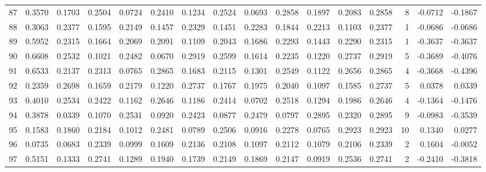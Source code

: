 \begin{tabular}{lrrrrrrrrrrrrrrr}
87  &      0.3570 &  0.1703 &  0.2504 &  0.0724 &  0.2410 &  0.1234 &  0.2524 &  0.0693 &  0.2858 &  0.1897 &   0.2083 &     0.2858 &      8 &                   -0.0712 &                    -0.1867 \\
88  &      0.3063 &  0.2377 &  0.1595 &  0.2149 &  0.1457 &  0.2329 &  0.1451 &  0.2283 &  0.1844 &  0.2213 &   0.1103 &     0.2377 &      1 &                   -0.0686 &                    -0.0686 \\
89  &      0.5952 &  0.2315 &  0.1664 &  0.2069 &  0.2091 &  0.1109 &  0.2043 &  0.1686 &  0.2293 &  0.1443 &   0.2290 &     0.2315 &      1 &                   -0.3637 &                    -0.3637 \\
90  &      0.6608 &  0.2532 &  0.1021 &  0.2482 &  0.0670 &  0.2919 &  0.2599 &  0.1614 &  0.2235 &  0.1220 &   0.2737 &     0.2919 &      5 &                   -0.3689 &                    -0.4076 \\
91  &      0.6533 &  0.2137 &  0.2313 &  0.0765 &  0.2865 &  0.1683 &  0.2115 &  0.1301 &  0.2549 &  0.1122 &   0.2656 &     0.2865 &      4 &                   -0.3668 &                    -0.4396 \\
92  &      0.2359 &  0.2698 &  0.1659 &  0.2179 &  0.1220 &  0.2737 &  0.1767 &  0.1975 &  0.2040 &  0.1097 &   0.1585 &     0.2737 &      5 &                    0.0378 &                     0.0339 \\
93  &      0.4010 &  0.2534 &  0.2422 &  0.1162 &  0.2646 &  0.1186 &  0.2414 &  0.0702 &  0.2518 &  0.1294 &   0.1986 &     0.2646 &      4 &                   -0.1364 &                    -0.1476 \\
94  &      0.3878 &  0.0339 &  0.1070 &  0.2531 &  0.0920 &  0.2423 &  0.0877 &  0.2479 &  0.0797 &  0.2895 &   0.2320 &     0.2895 &      9 &                   -0.0983 &                    -0.3539 \\
95  &      0.1583 &  0.1860 &  0.2184 &  0.1012 &  0.2481 &  0.0789 &  0.2506 &  0.0916 &  0.2278 &  0.0765 &   0.2923 &     0.2923 &     10 &                    0.1340 &                     0.0277 \\
96  &      0.0735 &  0.0683 &  0.2339 &  0.0999 &  0.1609 &  0.2136 &  0.2108 &  0.1097 &  0.2112 &  0.1079 &   0.2106 &     0.2339 &      2 &                    0.1604 &                    -0.0052 \\
97  &      0.5151 &  0.1333 &  0.2741 &  0.1289 &  0.1940 &  0.1739 &  0.2149 &  0.1869 &  0.2147 &  0.0919 &   0.2536 &     0.2741 &      2 &                   -0.2410 &                    -0.3818 \\

\end{tabular}
